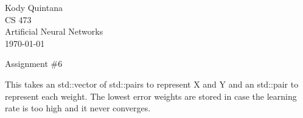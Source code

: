 \documentclass[14pt]{article}
\begin{document}
\begin{flushleft}
 
\large
Kody Quintana\\
CS 473\\
Artificial Neural Networks\\
\today\\
\boldmath

\begin{center}
Assignment \#6
\end{center}
This takes an std::vector of std::pairs to represent X and Y and an std::pair to represent each weight.
The lowest error weights are stored in case the learning rate is too high and it never converges.
\end{flushleft}
\end{document}
